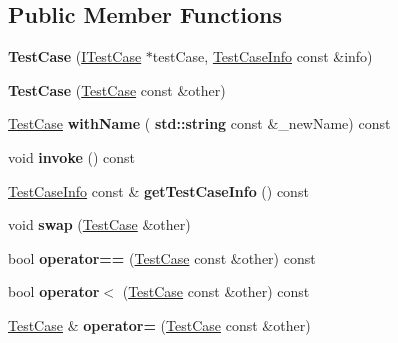 \subsection*{Public Member Functions}
\begin{DoxyCompactItemize}
\item 
\mbox{\label{class_catch_1_1_test_case_a03a5b913484681bd6d398dc5e9c2a907}} 
{\bfseries Test\+Case} (\hyperlink{struct_catch_1_1_i_test_case}{I\+Test\+Case} $\ast$test\+Case, \hyperlink{struct_catch_1_1_test_case_info}{Test\+Case\+Info} const \&info)
\item 
\mbox{\label{class_catch_1_1_test_case_ac0011d3789edc3e44edb41f13c4775a0}} 
{\bfseries Test\+Case} (\hyperlink{class_catch_1_1_test_case}{Test\+Case} const \&other)
\item 
\mbox{\label{class_catch_1_1_test_case_a0812e8a216d09b087d5874687009f0d6}} 
\hyperlink{class_catch_1_1_test_case}{Test\+Case} {\bfseries with\+Name} (\textbf{ std\+::string} const \&\+\_\+new\+Name) const
\item 
\mbox{\label{class_catch_1_1_test_case_a26f346c8446dded0562fe3818ae71651}} 
void {\bfseries invoke} () const
\item 
\mbox{\label{class_catch_1_1_test_case_a1ea0d79f49156cebea076fe1ba50d2b6}} 
\hyperlink{struct_catch_1_1_test_case_info}{Test\+Case\+Info} const  \& {\bfseries get\+Test\+Case\+Info} () const
\item 
\mbox{\label{class_catch_1_1_test_case_aee38f908faf10b905b209ca388275413}} 
void {\bfseries swap} (\hyperlink{class_catch_1_1_test_case}{Test\+Case} \&other)
\item 
\mbox{\label{class_catch_1_1_test_case_a5456d03a90f75292835c158f3a3374a1}} 
bool {\bfseries operator==} (\hyperlink{class_catch_1_1_test_case}{Test\+Case} const \&other) const
\item 
\mbox{\label{class_catch_1_1_test_case_a030e4b9282e9b32e08c8bd5e5cd6fa98}} 
bool {\bfseries operator$<$} (\hyperlink{class_catch_1_1_test_case}{Test\+Case} const \&other) const
\item 
\mbox{\label{class_catch_1_1_test_case_a8022e3f74232f7887d2d2cbbc8876502}} 
\hyperlink{class_catch_1_1_test_case}{Test\+Case} \& {\bfseries operator=} (\hyperlink{class_catch_1_1_test_case}{Test\+Case} const \&other)
\end{DoxyCompactItemize}
